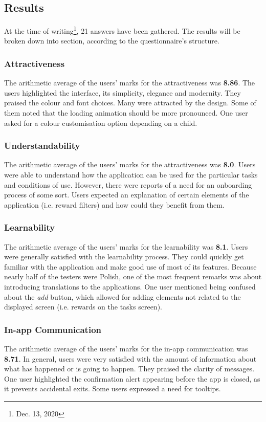 \subsection{Results}
At the time of writing\footnote{Dec. 13, 2020}, 21 answers have been gathered. The results will be broken down into section, according to the questionnaire's structure.


\subsubsection{Attractiveness}
The arithmetic average of the users' marks for the attractiveness was \textbf{8.86}. The users highlighted the interface, its simplicity, elegance and modernity. They praised the colour and font choices. Many were attracted by the design. Some of them noted that the loading animation should be more pronounced. One user asked for a colour customisation option depending on a child.


\subsubsection{Understandability}
The arithmetic average of the users' marks for the attractiveness was \textbf{8.0}. Users were able to understand how the application can be used for the particular tasks and conditions of use. However, there were reports of a need for an onboarding process of some sort. Users expected an explanation of certain elements of the application (i.e. reward filters) and how could they benefit from them.


\subsubsection{Learnability}
The arithmetic average of the users' marks for the learnability was \textbf{8.1}. Users were generally satisfied with the learnability process. They could quickly get familiar with the application and make good use of most of its features. Because nearly half of the testers were Polish, one of the most frequent remarks was about introducing translations to the applications. One user mentioned being confused about the \textit{add} button, which allowed for adding elements not related to the displayed screen (i.e. rewards on the tasks screen).


\subsubsection{In-app Communication}
The arithmetic average of the users' marks for the in-app communication was \textbf{8.71}. In general, users were very satisfied with the amount of information about what has happened or is going to happen. They praised the clarity of messages. One user highlighted the confirmation alert appearing before the app is closed, as it prevents accidental exits. Some users expressed a need for  tooltips. 


